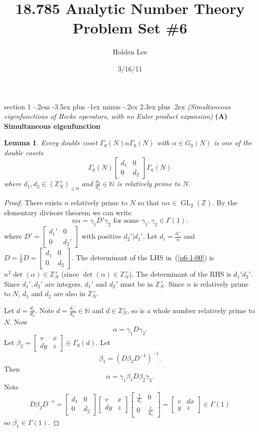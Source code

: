 \documentclass[12pt]{article}
\makeatletter
\theoremstyle{norm}
\newtheorem{lem}[thm]{Lemma}
\newcommand{\N}[0]{\mathbb{N}}
\newcommand{\Z}[0]{\mathbb{Z}}
\newcommand{\rc}[1]{\frac{1}{#1}}
\newcommand{\al}[0]{\alpha}
\newcommand{\be}[0]{\beta}
\newcommand{\ga}[0]{\gamma}
\newcommand{\Ga}[0]{\Gamma}
\newcommand{\subprob}[1]{\noindent\textbf{#1}\\}
\newcommand{\GL}{\operatorname{GL}}
\newcommand{\matt}[4]{
\left[
\begin{matrix}
{#1}&{#2}\\
{#3}&{#4}
\end{matrix}
\right]}
\newcommand{\smatt}[4]{
\left[
\begin{smallmatrix}
{#1}&{#2}\\
{#3}&{#4}
\end{smallmatrix}
\right]}
\newenvironment{problem}{\@startsection
       {section}
       {1}
       {-.2em}
       {-3.5ex plus -1ex minus -.2ex}
       {2.3ex plus .2ex}
       {\pagebreak[3]%
       \large\bf\noindent{Problem }
       }
       }
       {%
       }
\makeatother
\begin{document}
\title{18.785 Analytic Number Theory Problem Set \#6}%
\author{Holden Lee}
\date{3/16/11}%
\maketitle
\thispagestyle{empty}

\begin{problem}{\it (Simultaneous eigenfunctions of Hecke operators, with no Euler product expansion)}
\subprob{(A) Simultaneous eigenfunction}
\begin{lem}\label{p6-1-1}
Every double coset $\Ga_0(N)\al \Ga_0(N)$ with $\al\in G_0(N)$ is one of the double cosets
\[
\Ga_0(N)
\matt{d_1}00{d_2}
\Ga_0(N)
\]
where $d_1,d_2\in (\Z_N^{\times})_{\ge 0}$ and $\frac{d_2}{d_1}\in \N$ is relatively prime to $N$. 
\end{lem}
\begin{proof}
There exists $n$ relatively prime to $N$ so that $n\al \in \GL_2(\Z)$. 
By the elementary divisors theorem we can write
\begin{equation}\label{p6-1-00}
n\al=\ga_1 D'\ga_2\text{ for some }\ga_1,\ga_2\in \Ga(1).
\end{equation}
where $D'=\smatt{d_1'}00{d_2'}$ with positive $d_2'|d_1'$. Let $d_i=\frac{d_i'}{n}$ and $D=\rc nD=\smatt{d_1}00{d_2}$.
The determinant of the LHS in~(\ref{p6-1-00}) is $n^2\det(\al)\in \Z_N^{\times}$ (since $\det(\al)\in \Z_N^{\times}$). The determinant of the RHS is $d_1'd_2'$. Since $d_1',d_2'$ are integers, $d_1'$ and $d_2'$ must be in $\Z_N^{\times}$. Since $n$ is relatively prime to $N$, $d_1$ and $d_2$ are also in $\Z_N^{\times}$.

Let $d=\frac{d_1}{d_2}$. Note $d=\frac{d_1'}{d_2'}\in \N$ and $d\in\Z_N^{\times}$, so is a whole number relatively prime to $N$. 
Now
\[
\al =\ga_1D\ga_2.%
\]
Let $\be_2=\smatt vx{dy}z\in \Ga_0(d)$. Let
\[
\be_1=(D\be_2D^{-1})^{-1}.
\]
Then
\begin{equation}\label{p6-1-0}
\al=\ga_1\be_1 D\be_2 \ga_2.
\end{equation}
Note
\[
D\be_2D^{-1}=\matt{d_1}00{d_2}\matt vx{dy}z\matt{\rc{d_1}}00{\rc{d_2}}=\matt v{dx}{y}{z}\in \Ga(1)
\]
so $\be_1\in \Ga(1)$.


\end{proof}
\end{problem}
\end{document}
